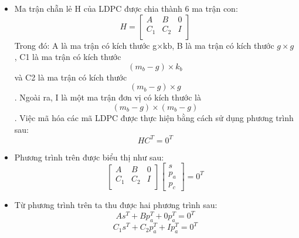 \documentclass{article}
\begin{document}
\begin{itemize}
      \item	Ma trận chẵn lẻ H của LDPC được chia thành 6 ma trận con:
      \begin{equation}\label{pt13}
         H = 
         \begin{bmatrix}
          A & B & 0 \\
          C_1 & C_2 & I \\ 
        \end{bmatrix}
      \end{equation}
      Trong đó: A là ma trận có kích thước g×kb, B là ma trận có kích thước $g×g$, C1 là ma trận có kích thước $$(m_b-g)×k_b$$ và C2 là ma trận có kích thước $$(m_b-g)×g$$. Ngoài ra, I là một ma trận đơn vị có kích thước là $$(m_b-g)×( m_b-g)$$. Việc mã hóa các mã LDPC được thực hiện bằng cách sử dụng phương trình sau: 
        \begin{equation}\label{pt14}
         HC^T= 0^T
        \end{equation}
     \item  Phương trình trên được biểu thị như sau:
      \begin{equation}\label{pt15}
          \begin{bmatrix}
            A & B & 0 \\
            C_1 & C_2 & I \\ 
          \end{bmatrix}
        \begin{bmatrix}
            s \\
           p_a \\
           p_c
          \end{bmatrix}
           = 0^T 
      \end{equation}
      \item  Từ phương trình trên ta thu được hai phương trình sau:
        \begin{equation}\label{pt16}
         As^T+Bp_a^T+0p_a^T = 0^T
      \end{equation}
      \begin{equation}\label{pt17}
         C_1s^T + C_2p_a^T + Ip_a^T = 0^T		
      \end{equation}
      

\end{itemize}
\end{document}

